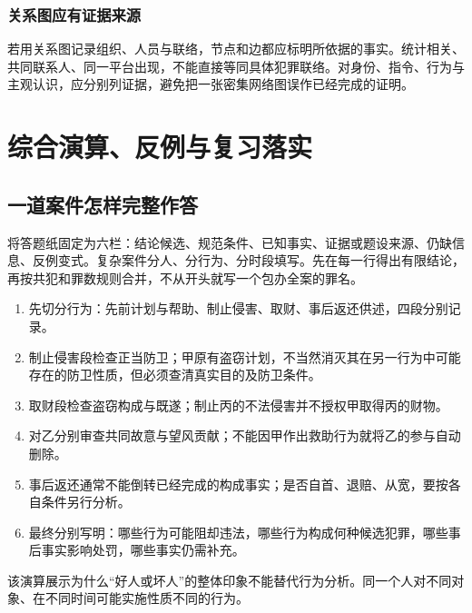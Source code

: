 \subsection{关系图应有证据来源}
若用关系图记录组织、人员与联络，节点和边都应标明所依据的事实。统计相关、共同联系人、同一平台出现，不能直接等同具体犯罪联络。对身份、指令、行为与主观认识，应分别列证据，避免把一张密集网络图误作已经完成的证明。




\chapter{综合演算、反例与复习落实}

\section{一道案件怎样完整作答}
将答题纸固定为六栏：结论候选、规范条件、已知事实、证据或题设来源、仍缺信息、反例变式。复杂案件分人、分行为、分时段填写。先在每一行得出有限结论，再按共犯和罪数规则合并，不从开头就写一个包办全案的罪名。

\begin{enumerate}
\item 先切分行为：先前计划与帮助、制止侵害、取财、事后返还供述，四段分别记录。
\item 制止侵害段检查正当防卫；甲原有盗窃计划，不当然消灭其在另一行为中可能存在的防卫性质，但必须查清真实目的及防卫条件。
\item 取财段检查盗窃构成与既遂；制止丙的不法侵害并不授权甲取得丙的财物。
\item 对乙分别审查共同故意与望风贡献；不能因甲作出救助行为就将乙的参与自动删除。
\item 事后返还通常不能倒转已经完成的构成事实；是否自首、退赔、从宽，要按各自条件另行分析。
\item 最终分别写明：哪些行为可能阻却违法，哪些行为构成何种候选犯罪，哪些事后事实影响处罚，哪些事实仍需补充。
\end{enumerate}
该演算展示为什么“好人或坏人”的整体印象不能替代行为分析。同一个人对不同对象、在不同时间可能实施性质不同的行为。

